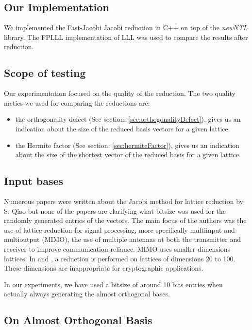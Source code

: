 \documentclass[10pt, a4paper]{article}
\begin{document}
\subsection{Our Implementation}

We implemented the Fast-Jacobi\cite{fastJacobi} Jacobi reduction in C++ on top of the \emph{newNTL} library. The FPLLL implementation of LLL was used to compare the results after reduction.

\subsection{Scope of testing}

Our experimentation focused on the quality of the reduction. The two quality metics we used for comparing the reductions are:

\begin{itemize}
\item the orthogonality defect (See section: \ref{sec:orthogonalityDefect}), gives us an indication about the size of the reduced basis vectors for a given lattice.
\item the Hermite factor (See section: \ref{sec:hermiteFactor}), gives us an indication about the size of the shortest vector of the reduced basis for a given lattice.
\end{itemize}

\subsection{Input bases}
Numerous papers were written about the Jacobi method for lattice reduction by S. Qiao \cite{originalJacobiMethodLatticeBasisReduction}\cite{complexityAnalysisOfJacobiMethod}\cite{enhancedJacobi} but none of the papers are clarifying what bitsize was used for the randomly generated entries of the vectors. The main focus of the authors was the use of lattice reduction for signal processing, more specifically multiinput and multioutput (MIMO), the use of multiple antennas at both the transmitter and receiver to improve communication reliance. MIMO uses smaller dimensions lattices. In \cite{enhancedJacobi} and \cite{tian2014hybrid}, a reduction is performed on lattices of dimensions 20 to 100. These dimensions are inappropriate for cryptographic applications.

In our experiments, we have used a bitsize of around 10 bits entries when actually always generating the almost orthogonal bases.

\subsection{On Almost Orthogonal Basis}
\end{document}
